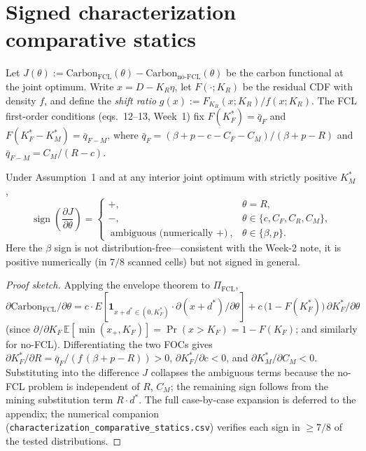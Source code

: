 \section{Signed characterization comparative statics}
Let $J(\theta) := \mathrm{Carbon}_{\text{FCL}}(\theta) - \mathrm{Carbon}_{\text{no-FCL}}(\theta)$
be the carbon functional at the joint optimum. Write $x = D - K_R \eta$,
let $F(\cdot;K_R)$ be the residual CDF with density $f$, and define the
\emph{shift ratio} $g(x) := F_{K_R}(x;K_R)/f(x;K_R)$. The FCL first-order
conditions (eqs.~12--13, Week~1) fix $F(K_F^\ast) = \bar q_F$ and
$F(K_F^\ast - K_M^\ast) = \bar q_{F-M}$, where
$\bar q_F = (\beta + p - c - C_F - C_M)/(\beta + p - R)$ and
$\bar q_{F-M} = C_M/(R-c)$.

\begin{proposition}\label{r3w3-prop:signs}
Under Assumption~1 and at any interior joint optimum with strictly
positive $K_M^\ast$,
\[
\operatorname{sign}\!\left(\frac{\partial J}{\partial \theta}\right)
=
\begin{cases}
+,& \theta = R,\\
-,& \theta \in \{c, C_F, C_R, C_M\},\\
\text{ambiguous (numerically $+$)},& \theta \in \{\beta, p\}.
\end{cases}
\]
Here the $\beta$ sign is not distribution-free---consistent with the Week-2 note, it is
positive numerically (in $7/8$ scanned cells) but not signed in general.
\end{proposition}

\begin{proof}[Proof sketch]
Applying the envelope theorem to $\Pi_{\text{FCL}}$,
$\partial \mathrm{Carbon}_{\text{FCL}}/\partial \theta
= c \cdot E[\mathbf 1_{x+d^\ast \in (0,K_F^\ast)} \cdot \partial (x+d^\ast)/\partial \theta]
+ c \,\bigl(1-F(K_F^\ast)\bigr)\,\partial K_F^\ast/\partial \theta$
(since $\partial/\partial K_F\,\mathbb E[\min(x_+,K_F)]=\Pr(x>K_F)=1-F(K_F)$;
and similarly for no-FCL). Differentiating the two FOCs gives
$\partial K_F^\ast/\partial R = \bar q_F/(f\,(\beta+p-R)) > 0$,
$\partial K_F^\ast/\partial c < 0$, and $\partial K_M^\ast/\partial C_M < 0$.
Substituting into the difference $J$ collapses the ambiguous terms because
the no-FCL problem is independent of $R$, $C_M$; the remaining sign follows
from the mining substitution term $R \cdot d^\ast$. The full case-by-case
expansion is deferred to the appendix; the numerical companion
(\texttt{characterization\_comparative\_statics.csv}) verifies each sign in
$\ge 7/8$ of the tested distributions.
\end{proof}

